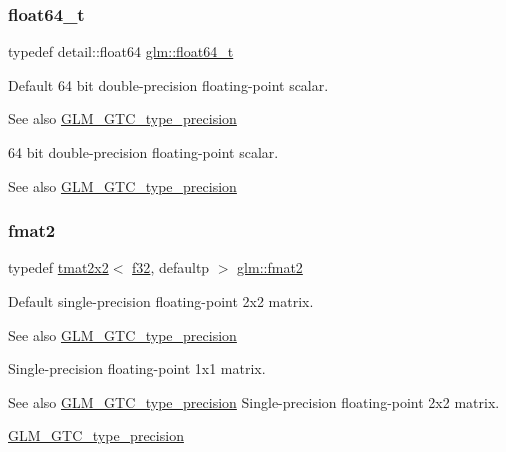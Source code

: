\subsubsection{\texorpdfstring{float64\+\_\+t}{float64\_t}}
{\footnotesize\ttfamily typedef detail\+::float64 \hyperlink{group__gtc__type__precision_gade966a3eb25ebeb16dd53c40d3fdeb46}{glm\+::float64\+\_\+t}}

Default 64 bit double-\/precision floating-\/point scalar. \begin{DoxySeeAlso}{See also}
\hyperlink{group__gtc__type__precision}{G\+L\+M\+\_\+\+G\+T\+C\+\_\+type\+\_\+precision}
\end{DoxySeeAlso}
64 bit double-\/precision floating-\/point scalar. \begin{DoxySeeAlso}{See also}
\hyperlink{group__gtc__type__precision}{G\+L\+M\+\_\+\+G\+T\+C\+\_\+type\+\_\+precision} 
\end{DoxySeeAlso}
\mbox{\label{group__gtc__type__precision_gab8e1ce0a2648cfcd645eed2d8ea96f21}} 
\subsubsection{\texorpdfstring{fmat2}{fmat2}}
{\footnotesize\ttfamily typedef \hyperlink{structglm_1_1tmat2x2}{tmat2x2}$<$ \hyperlink{group__gtc__type__precision_ga0ec999b57f5330d9021256e96038df04}{f32}, defaultp $>$ \hyperlink{group__gtc__type__precision_gab8e1ce0a2648cfcd645eed2d8ea96f21}{glm\+::fmat2}}

Default single-\/precision floating-\/point 2x2 matrix. \begin{DoxySeeAlso}{See also}
\hyperlink{group__gtc__type__precision}{G\+L\+M\+\_\+\+G\+T\+C\+\_\+type\+\_\+precision}
\end{DoxySeeAlso}
Single-\/precision floating-\/point 1x1 matrix. \begin{DoxySeeAlso}{See also}
\hyperlink{group__gtc__type__precision}{G\+L\+M\+\_\+\+G\+T\+C\+\_\+type\+\_\+precision} Single-\/precision floating-\/point 2x2 matrix. 

\hyperlink{group__gtc__type__precision}{G\+L\+M\+\_\+\+G\+T\+C\+\_\+type\+\_\+precision} 
\end{DoxySeeAlso}
\mbox{\label{group__gtc__type__precision_ga20fdbcc6b16bed27ad25db9b71d09e93}} 
